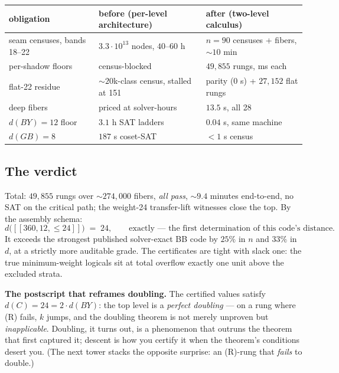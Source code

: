 \documentclass[11pt]{article}
\theoremstyle{plain}
\theoremstyle{definition}
\theoremstyle{remark}
\begin{document}
\begin{center}
\small
\begin{tabular}{lll}
\toprule
obligation & before (per-level architecture) & after (two-level calculus)\\
\midrule
seam censuses, bands 18--22 & $3.3\cdot 10^{13}$ nodes, $40$--$60$ h &
$n{=}90$ censuses + fibers, ${\sim}10$ min\\
per-shadow floors & census-blocked & $49{,}855$ rungs, ms each\\
flat-22 residue & ${\sim}20$k-class census, stalled at 151 &
parity (0 s) + $27{,}152$ flat rungs\\
deep fibers & priced at solver-hours & $13.5$ s, all 28\\
$d(BY) = 12$ floor & $3.1$ h SAT ladders & $0.04$ s, same machine\\
$d(GB) = 8$ & $187$ s coset-SAT & $< 1$ s census\\
\bottomrule
\end{tabular}
\end{center}

\subsection{The verdict}

Total: $49{,}855$ rungs over ${\sim}274{,}000$ fibers, \emph{all pass},
${\sim}9.4$ minutes end-to-end, no SAT on the critical path; the
weight-24 transfer-lift witnesses close the top. By the assembly schema:
\[
d\bigl([[360,12,\leq 24]]\bigr) \;=\; 24, \qquad
\text{exactly --- the first determination of this code's distance.}
\]
It exceeds the strongest published solver-exact BB code by $25\%$ in
$n$ and $33\%$ in $d$, at a strictly more auditable grade. The
certificates are tight with slack one: the true minimum-weight logicals
sit at total overflow exactly one unit above the excluded strata.

\begin{sloganbox}
\textbf{The postscript that reframes doubling.} The certified values
satisfy $d(C) = 24 = 2 \cdot d(BY)$: the top level is a \emph{perfect
doubling} --- on a rung where (R) fails, $k$ jumps, and the doubling
theorem is not merely unproven but \emph{inapplicable}. Doubling, it
turns out, is a phenomenon that outruns the theorem that first captured
it; descent is how you certify it when the theorem's conditions desert
you. (The next tower stacks the opposite surprise: an (R)-rung that
\emph{fails} to double.)
\end{sloganbox}
\end{document}
